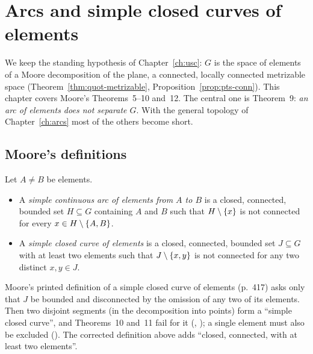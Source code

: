 \chapter{Arcs and simple closed curves of elements}\label{ch:elements}

We keep the standing hypothesis of Chapter~\ref{ch:usc}: $G$ is the space of elements of a Moore
decomposition of the plane, a connected, locally connected metrizable space
(Theorem~\ref{thm:quot-metrizable}, Proposition~\ref{prop:pts-conn}). This chapter covers Moore's
Theorems~5--10 and~12. The central one is Theorem~9: \emph{an arc of elements does not separate
$G$}. With the general topology of Chapter~\ref{ch:arcs} most of the others become short.

\section{Moore's definitions}

\begin{definition}\label{def:arc-elt}
Let $A\ne B$ be elements.
\begin{itemize}
\item A \emph{simple continuous arc of elements from $A$ to $B$} is a closed, connected, bounded set
$H\subseteq G$ containing $A$ and $B$ such that $H\setminus\left\{ x \right\}$ is not connected for every $x\in
H\setminus\left\{ A,B \right\}$.
\item A \emph{simple closed curve of elements} is a closed, connected, bounded set $J\subseteq G$ with
at least two elements such that $J\setminus\left\{ x,y \right\}$ is not connected for any two distinct $x,y\in
J$.
\end{itemize}
\end{definition}


Moore's printed definition of a simple closed curve of elements (p.~417) asks only that $J$ be
bounded and disconnected by the omission of any two of its elements. Then two disjoint segments
(in the decomposition into points) form a ``simple closed curve'', and Theorems~10 and~11 fail for
it (, ); a single
element must also be excluded (). The corrected
definition above adds ``closed, connected, with at least two elements''.

